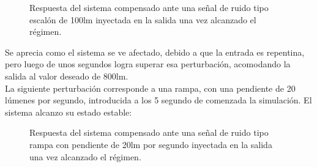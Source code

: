 \documentclass[a4paper,11pt]{article}
\begin{document}
	  \begin{figure}[H] %
	\caption{Respuesta del sistema compensado ante una señal de ruido tipo escalón de 100lm inyectada en la salida una vez alcanzado el régimen.}
	\label{fig:ruido1}
	\end{figure} 

Se aprecia como el sistema se ve afectado, debido a que la entrada es repentina, pero luego de unos segundos logra superar esa perturbación, acomodando la salida al valor deseado de 800lm.\\
La siguiente perturbación corresponde a una rampa, con una pendiente de 20 lúmenes por segundo, introducida a los 5 segundo de comenzada la simulación. El sistema alcanzo su estado estable:\\

	  \begin{figure}[H] %
	\caption{Respuesta del sistema compensado ante una señal de ruido tipo rampa con pendiente de 20lm por segundo inyectada en la salida una vez alcanzado el régimen.}
	\label{fig:ruido2}
	\end{figure} 
\end{document}
